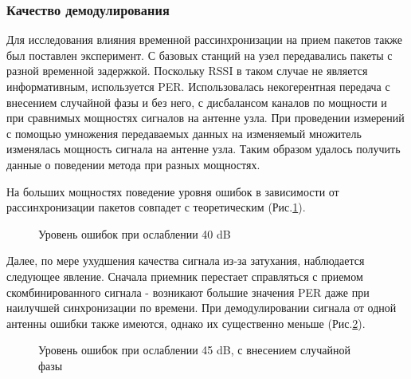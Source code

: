 \documentclass[a4paper,12pt,oneside, abstract=true]{scrartcl}
\begin{document}
\subsubsection{Качество демодулирования}
Для исследования влияния временной рассинхронизации на прием пакетов также был поставлен эксперимент. 
С базовых станций на узел передавались пакеты с разной временной задержкой. 
Поскольку RSSI в таком случае не является информативным, используется PER.
Использовалась некогерентная передача с внесением случайной фазы и без него, с дисбалансом каналов по мощности и при сравнимых мощностях сигналов на антенне узла. 
При проведении измерений с помощью умножения передаваемых данных на изменяемый множитель изменялась мощность сигнала на антенне узла.
Таким образом удалось получить данные о поведении метода при разных мощностях.

На больших мощностях поведение уровня ошибок в зависимости от рассинхронизации пакетов совпадет с теоретическим (Рис.\ref{fig:Timing40}).

\begin{figure}[!htb]
\caption{Уровень ошибок при ослаблении 40 dB}
\label{fig:Timing40}
\end{figure}

Далее, по мере ухудшения качества сигнала из-за затухания, наблюдается следующее явление. 
Сначала приемник перестает справляться с приемом скомбинированного сигнала - возникают большие значения PER даже при наилучшей синхронизации по времени. 
При демодулировании сигнала от одной антенны ошибки также имеются, однако их существенно меньше (Рис.\ref{fig:Timing45}).

\begin{figure}[!htb]
	\caption{Уровень ошибок при ослаблении 45 dB, с внесением случайной фазы}
	\label{fig:Timing45}
\end{figure}
\end{document}
